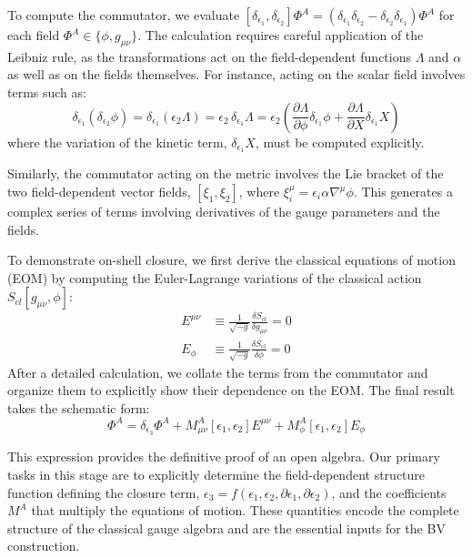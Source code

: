 \documentclass[twocolumn]{aastex631}
\begin{document}
To compute the commutator, we evaluate $[\delta_{\epsilon_1}, \delta_{\epsilon_2}] \Phi^A = (\delta_{\epsilon_1}\delta_{\epsilon_2} - \delta_{\epsilon_2}\delta_{\epsilon_1})\Phi^A$ for each field $\Phi^A \in \{\phi, g_{\mu\nu}\}$. The calculation requires careful application of the Leibniz rule, as the transformations act on the field-dependent functions $\Lambda$ and $\alpha$ as well as on the fields themselves. For instance, acting on the scalar field involves terms such as:
\begin{equation}
\delta_{\epsilon_1}(\delta_{\epsilon_2}\phi) = \delta_{\epsilon_1}(\epsilon_2 \Lambda) = \epsilon_2 \, \delta_{\epsilon_1}\Lambda = \epsilon_2 \left( \frac{\partial\Lambda}{\partial\phi}\delta_{\epsilon_1}\phi + \frac{\partial\Lambda}{\partial X}\delta_{\epsilon_1}X \right)
\end{equation}
where the variation of the kinetic term, $\delta_{\epsilon_1}X$, must be computed explicitly.

Similarly, the commutator acting on the metric involves the Lie bracket of the two field-dependent vector fields, $[\xi_1, \xi_2]$, where $\xi_i^\mu = \epsilon_i \alpha \nabla^\mu \phi$. This generates a complex series of terms involving derivatives of the gauge parameters and the fields.

To demonstrate on-shell closure, we first derive the classical equations of motion (EOM) by computing the Euler-Lagrange variations of the classical action $S_{cl}[g_{\mu\nu},\phi]$:
\begin{align}
E^{\mu\nu} &\equiv \frac{1}{\sqrt{-g}} \frac{\delta S_{cl}}{\delta g_{\mu\nu}} = 0 \\
E_{\phi} &\equiv \frac{1}{\sqrt{-g}} \frac{\delta S_{cl}}{\delta \phi} = 0
\end{align}
After a detailed calculation, we collate the terms from the commutator and organize them to explicitly show their dependence on the EOM. The final result takes the schematic form:
\begin{equation}
[\delta_{\epsilon_1}, \delta_{\epsilon_2}] \Phi^A = \delta_{\epsilon_3} \Phi^A + M^A_{\mu\nu}[\epsilon_1, \epsilon_2] E^{\mu\nu} + M^A_{\phi}[\epsilon_1, \epsilon_2] E_{\phi}
\end{equation}

This expression provides the definitive proof of an open algebra. Our primary tasks in this stage are to explicitly determine the field-dependent structure function defining the closure term, $\epsilon_3 = f(\epsilon_1, \epsilon_2, \partial\epsilon_1, \partial\epsilon_2)$, and the coefficients $M^A$ that multiply the equations of motion. These quantities encode the complete structure of the classical gauge algebra and are the essential inputs for the BV construction.
\end{document}
